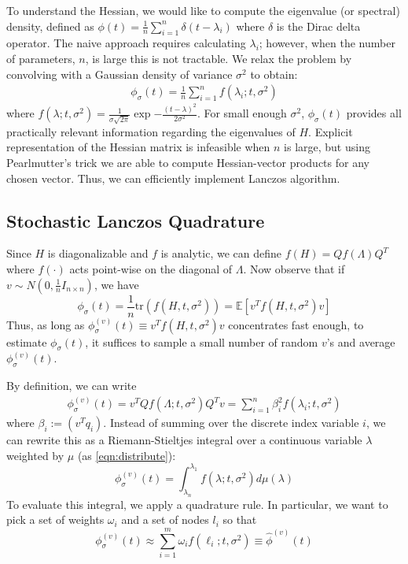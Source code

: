 \documentclass[conference]{IEEEtran}
\newcommand{\tr}[1]{\mathrm{tr} \left(#1\right)}
\newcommand{\phis}{\phi_{\sigma}}
\newcommand{\phisv}{\phis^{(v)}}
\DeclareMathOperator{\1}{\mathbf{1}}
\newcommand{\E}[1]{\mathbb{E}\left[#1\right]}
\theoremstyle{definition}
\begin{document}
To understand the Hessian, we would like to compute the eigenvalue (or spectral) density, defined as $\phi(t) = \frac{1}{n} \sum_{i=1}^n \delta(t - \lambda_i)$ where $\delta$ is the Dirac delta operator. The naive approach requires calculating $\lambda_i$; however, when the number of parameters, $n$, is large this is not tractable. We relax the problem by convolving with a Gaussian density of variance $\sigma^2$ to obtain:
\begin{align}\label{eqn:smoothed_density}
  \phi_\sigma(t) = \frac{1}{n} \sum_{i=1}^n f(\lambda_i; t, \sigma^2)
\end{align}
where $f(\lambda; t, \sigma^2) =\frac{1}{\sigma \sqrt{2 \pi}} \exp{- \frac{(t - \lambda)^2}{2 \sigma^2}}.$ 
For small enough $\sigma^2$, $\phi_\sigma(t)$ provides all practically relevant information regarding the eigenvalues of $H$. Explicit representation of the Hessian matrix is infeasible when $n$ is large, but using Pearlmutter's trick \cite{pearlmutter1994fast} we are able to compute Hessian-vector products for any chosen vector. Thus, we can efficiently implement Lanczos algorithm.

\subsection{Stochastic Lanczos Quadrature}
Since $H$ is diagonalizable and $f$ is analytic, we can define $f(H) = Q f(\Lambda) Q^T$ where $f(\cdot)$ acts point-wise on the diagonal of $\Lambda$. Now observe that if $v \sim N(0, \frac{1}{n} I_{n \times n})$, we have
\begin{equation}
\phis(t) = \frac{1}{n} \tr{f(H, t, \sigma^2)} = \E{v^T f(H, t, \sigma^2) v} \label{eqn:smoothed}
\end{equation}
Thus, as long as $\phisv(t) \equiv v^T f(H, t, \sigma^2) v$ concentrates fast enough, to estimate $\phis(t)$, it suffices to sample a small number of random $v$'s and average $\phisv(t)$.

By definition, we can write
\begin{equation} 
    \begin{split}
        \phisv(t) = v^T Q f(\Lambda; t, \sigma^2) Q^T v =\sum_{i=1}^n \beta_i^2 f(\lambda_i; t, \sigma^2)
    \end{split}
\label{eqn:beta_sum}
\end{equation}
where $\beta_i := (v^T q_i)$. Instead of summing over the discrete index variable $i$, we can rewrite this as a Riemann-Stieltjes integral over a continuous variable $\lambda$ weighted by $\mu$ (as \ref{eqn:distribute}):
\begin{equation} 
\phisv(t) = \int_{\lambda_n}^{\lambda_1} f(\lambda; t, \sigma^2) d\mu(\lambda)\label{eqn:integral}
\end{equation}
To evaluate this integral, we apply a quadrature rule. In particular, we want to pick a set of weights $\omega_i$ and a set of nodes $l_i$ so that
\begin{equation}\label{eqn:approx_form}
  \phisv(t) \approx \sum_{i=1}^m \omega_i f(\ell_i; t, \sigma^2) \equiv \widehat{\phi}^{(v)}(t)
\end{equation}
\end{document}
